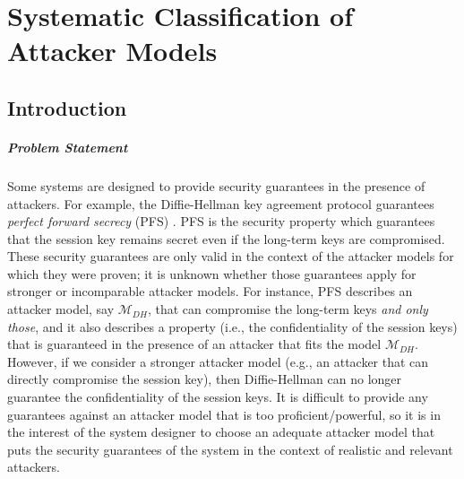 \chapter{Systematic Classification of Attacker Models} %
\label{ch:Classification}
\section{Introduction}
\label{sec:Classification:ClassificationProblem}
\paragraph{Problem Statement}
Some systems are designed to provide security guarantees in the presence of attackers. For example, the Diffie-Hellman key agreement protocol guarantees \emph{perfect forward secrecy} (PFS) \cite{Gunther1990,Menezes1996}. PFS is the security property which guarantees that the session key remains secret even if the long-term keys are compromised. These security guarantees are only valid in the context of the attacker models for which they were proven; it is unknown whether those guarantees apply for stronger or incomparable attacker models. For instance, PFS describes an attacker model, say $\mathcal{M}_{DH}$, that can compromise the long-term keys \emph{and only those}, and it also describes a property (i.e., the confidentiality of the session keys) that is guaranteed in the presence of an attacker that fits the model $\mathcal{M}_{DH}$. However, if we consider a stronger attacker model (e.g., an attacker that can directly compromise the session key), then Diffie-Hellman can no longer guarantee the confidentiality of the session keys. It is difficult to provide any guarantees against an attacker model that is too proficient/powerful, so it is in the interest of the system designer to choose an adequate attacker model that puts the security guarantees of the system in the context of realistic and relevant attackers. 
 
